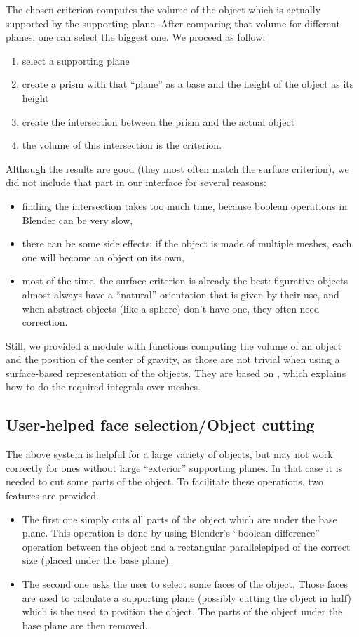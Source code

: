 \documentclass{report}
\begin{document}
	The chosen criterion computes the volume of the object which is actually supported by the supporting plane. After comparing that volume for different planes, one can select the biggest one.
	We proceed as follow:
	\begin{enumerate}
		\item select a supporting plane
		\item create a prism with that “plane” as a base and the height of the object as its height
		\item create the intersection between the prism and the actual object
		\item the volume of this intersection is the criterion.
	\end{enumerate}

	Although the results are good (they most often match the surface criterion), we did not include that part in our interface for several reasons:
	\begin{itemize}
		\item finding the intersection takes too much time, because boolean operations in Blender can be very slow,
		\item there can be some side effects: if the object is made of multiple meshes, each one will become an object on its own,
		\item most of the time, the surface criterion is already the best: figurative objects almost always have a “natural” orientation that is given by their use, and when abstract objects (like a sphere) don't have one, they often need correction.
	\end{itemize}

	Still, we provided a module with functions computing the volume of an object and the position of the center of gravity, as those are not trivial when using a surface-based representation of the objects. They are based on \cite{Liris-2411}, which explains how to do the required integrals over meshes.

\subsection{User-helped face selection/Object cutting}\label{sec:cutting}
The above system is helpful for a large variety of objects, but may not work correctly for ones without large ``exterior'' supporting planes. In that case it is needed to cut some parts of the object. To facilitate these operations, two features are provided.

\begin{itemize}
\item The first one simply cuts all parts of the object which are under the base plane. This operation is done by using Blender’s ``boolean difference'' operation between the object and a rectangular parallelepiped of the correct size (placed under the base plane).
\item The second one asks the user to select some faces of the object. Those faces are used to calculate a supporting plane (possibly cutting the object in half) which is the used to position the object. The parts of the object under the base plane are then removed.
\end{itemize}
\end{document}
